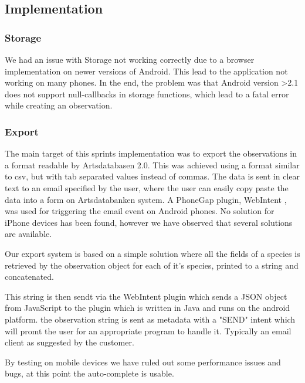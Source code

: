 \subsection{Implementation}

\subsubsection{Storage}

\label{sprint3:storage}

We had an issue with Storage not working correctly due to a browser
implementation on newer versions of Android. This lead to the application
not working on many  phones. In the end, the problem was that Android
version >2.1 does not support null-callbacks in storage functions, which
lead to a fatal error while creating an observation. 

	\subsubsection{Export}

	The main target of this sprints implementation was to export the
	observations in a format readable by Artsdatabasen 2.0. This was achieved
	using a format similar to csv, but with tab separated values instead of
	commas. The data is sent in clear text to an email specified by the user,
	where the user can easily copy paste the data into a form on Artsdatabanken
	system. A PhoneGap plugin, WebIntent \cite{library:webintent}, was used for triggering the email
	event on Android phones. No solution for iPhone devices has been found,
	however we have observed that several solutions are available.
	
	Our export system is based on a simple solution where all the fields of a species
	is retrieved by the observation object for each of it's species, printed to a string
	and concatenated.
	
	This string is then sendt via the WebIntent plugin which sends a JSON object from
	JavaScript to the plugin which is written in Java and runs on the android platform.
	the observation string is sent as metadata with a "SEND" intent which will promt 
	the user for an appropriate program to handle it. Typically an email client as
	suggested by the customer.

\label{Auto-complete}

By testing on mobile devices we have ruled out some performance issues and bugs,
at this point the auto-complete is usable.

